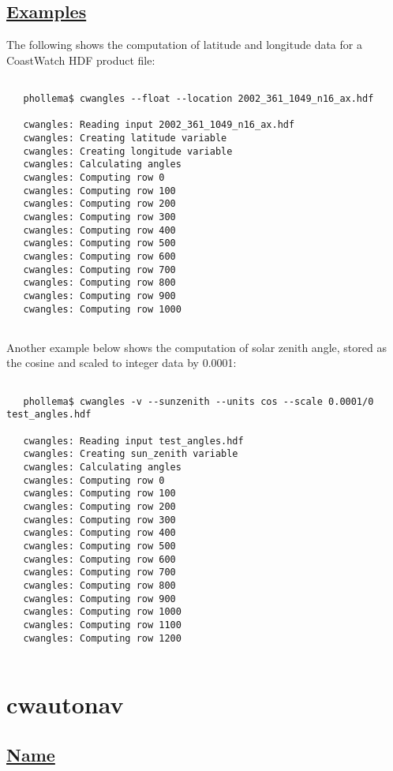 \subsection*{\underline{Examples}}


  The following shows the computation of latitude and longitude data for a CoastWatch HDF product file:
\begin{verbatim}
 
   phollema$ cwangles --float --location 2002_361_1049_n16_ax.hdf

   cwangles: Reading input 2002_361_1049_n16_ax.hdf
   cwangles: Creating latitude variable
   cwangles: Creating longitude variable
   cwangles: Calculating angles
   cwangles: Computing row 0
   cwangles: Computing row 100
   cwangles: Computing row 200
   cwangles: Computing row 300
   cwangles: Computing row 400
   cwangles: Computing row 500
   cwangles: Computing row 600
   cwangles: Computing row 700
   cwangles: Computing row 800
   cwangles: Computing row 900
   cwangles: Computing row 1000
 
\end{verbatim}


 Another example below shows the computation of solar zenith angle, stored as the cosine and scaled to integer data by 0.0001:
\begin{verbatim}
 
   phollema$ cwangles -v --sunzenith --units cos --scale 0.0001/0 test_angles.hdf

   cwangles: Reading input test_angles.hdf
   cwangles: Creating sun_zenith variable
   cwangles: Calculating angles
   cwangles: Computing row 0
   cwangles: Computing row 100
   cwangles: Computing row 200
   cwangles: Computing row 300
   cwangles: Computing row 400
   cwangles: Computing row 500
   cwangles: Computing row 600
   cwangles: Computing row 700
   cwangles: Computing row 800
   cwangles: Computing row 900
   cwangles: Computing row 1000
   cwangles: Computing row 1100
   cwangles: Computing row 1200
 
\end{verbatim}

\newpage
\section{cwautonav} \hypertarget{cwautonav}{}
\subsection*{\underline{Name}}


